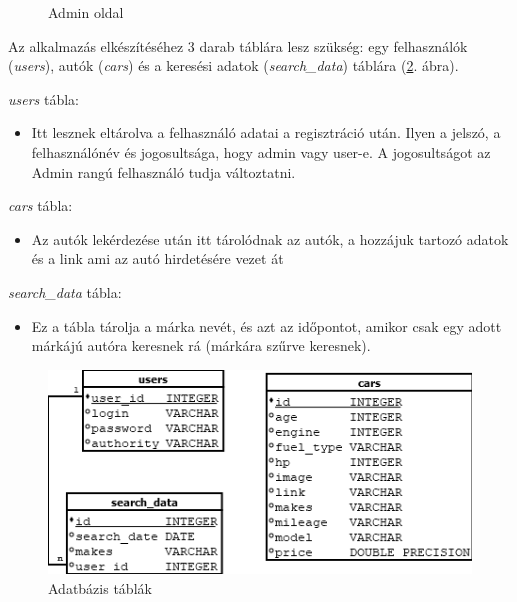 \begin{figure}[h]
\centering
{}
\caption{Admin oldal}
\label{fig:Admin}
\end{figure}
\newpage


Az alkalmazás elkészítéséhez 3 darab táblára lesz szükség: egy
felhasználók (\textit{users}), autók (\textit{cars}) és a keresési adatok (\textit{search\_data}) táblára (\ref{fig:DataTable}. ábra).

\medskip
\textit{users} tábla:
\begin{itemize}
\item Itt lesznek eltárolva a felhasználó adatai a regisztráció után. Ilyen a jelszó, a felhasználónév és jogosultsága, hogy admin vagy user-e. A jogosultságot az Admin rangú felhasználó tudja változtatni.
\end{itemize}

\textit{cars} tábla:
\begin{itemize}
\item Az autók lekérdezése után itt tárolódnak az autók,  a hozzájuk tartozó adatok és a link ami az autó hirdetésére vezet át
\end{itemize}

\textit{search\_data} tábla:
\begin{itemize}
\item Ez a tábla tárolja a márka nevét, és azt az időpontot, amikor csak egy adott márkájú autóra keresnek rá (márkára szűrve keresnek).
\end{itemize}
 
 \begin{figure}[h]
\centering
\includegraphics[scale=0.7]{images/Data_Table.png}
\caption{Adatbázis táblák}
\label{fig:DataTable}
\end{figure}

